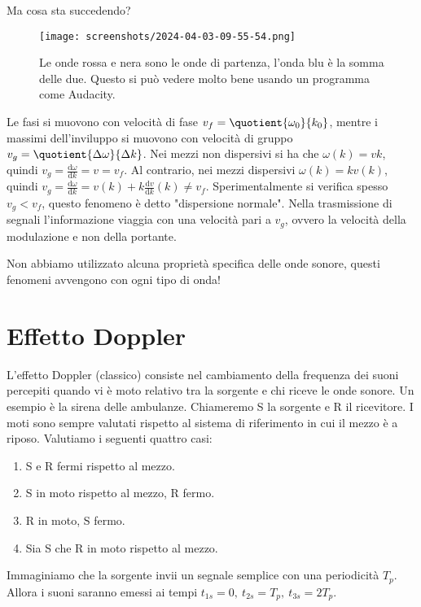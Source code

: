 Ma cosa sta succedendo?
\begin{figure}[H]
	\centering
	\texttt{[image: screenshots/2024-04-03-09-55-54.png]}
	\caption{Le onde rossa e nera sono le onde di partenza, l'onda blu è la somma delle due. Questo si può vedere molto bene usando un programma come Audacity.}
\end{figure}
Le fasi si muovono con velocità di fase \(v_f = \quotient{\omega _0}{k_0} \), mentre i massimi dell'inviluppo si muovono con velocità di gruppo \(v_g = \quotient{\Delta \omega }{\Delta k} \). Nei mezzi non dispersivi si ha che \(\omega (k) = vk\), quindi \(v_g = \frac{\mathrm{d} \omega }{\mathrm{d} k} = v = v_f \). Al contrario, nei mezzi dispersivi \(\omega (k) = k v(k)\), quindi \(v_g = \frac{\mathrm{d} \omega }{\mathrm{d} k} = v(k) + k \frac{\mathrm{d} v}{\mathrm{d} k}(k) \neq v_f \).
Sperimentalmente si verifica spesso \(v_g < v_f\), questo fenomeno è detto "dispersione normale". Nella trasmissione di segnali l'informazione viaggia con una velocità pari a \(v_g\), ovvero la velocità della modulazione e non della portante.
\begin{note}
	Non abbiamo utilizzato alcuna proprietà specifica delle onde sonore, questi fenomeni avvengono con ogni tipo di onda!
\end{note}

\section{Effetto Doppler}
L'effetto Doppler (classico) consiste nel cambiamento della frequenza dei suoni percepiti quando vi è moto relativo tra la sorgente e chi riceve le onde sonore. Un esempio è la sirena delle ambulanze. Chiameremo S la sorgente e R il ricevitore. I moti sono sempre valutati rispetto al sistema di riferimento in cui il mezzo è a riposo. Valutiamo i seguenti quattro casi:
\begin{enumerate}
	\item S e R fermi rispetto al mezzo.
	\item S in moto rispetto al mezzo, R fermo.
	\item R in moto, S fermo.
	\item Sia S che R in moto rispetto al mezzo.
\end{enumerate}
Immaginiamo che la sorgente invii un segnale semplice con una periodicità \(T_p\). Allora i suoni saranno emessi ai tempi \(t_{1s} = 0,\ t_{2s} = T_p,\ t_{3s} = 2T_p\).
